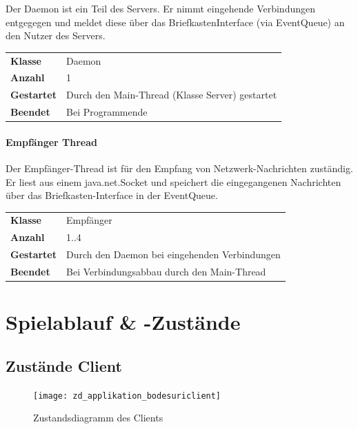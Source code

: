 \documentclass[12pt,halfparskip]{scrartcl}
\begin{document}
Der Daemon ist ein Teil des Servers. Er nimmt eingehende Verbindungen entgegegen und meldet diese über das BriefkastenInterface (via EventQueue) an den Nutzer des Servers.

\begin{tabular}{@{} l p{12.5cm}}
\textbf{Klasse}       & Daemon \\
\textbf{Anzahl}       & 1 \\
\textbf{Gestartet}    & Durch den Main-Thread (Klasse Server) gestartet \\
\textbf{Beendet}      & Bei Programmende
\end{tabular}


\paragraph{Empfänger Thread} %
\label{ssub:empfänger_thread}

Der Empfänger-Thread ist für den Empfang von Netzwerk-Nachrichten zuständig. Er liest aus einem java.net.Socket und speichert die eingegangenen Nachrichten über das Briefkasten-Interface in der EventQueue.

\begin{tabular}{@{} l p{12.5cm}}
\textbf{Klasse}       & Empfänger \\
\textbf{Anzahl}       & 1..4 \\
\textbf{Gestartet}    & Durch den Daemon bei eingehenden Verbindungen  \\
\textbf{Beendet}      & Bei Verbindungsabbau durch den Main-Thread
\end{tabular}


\clearpage
\section{Spielablauf \& -Zustände} %
\label{spielzustaende_nachrichten}
\subsection{Zustände Client} %
\label{sub:zustände_client}
\begin{figure}[h]
	\centering
	\texttt{[image: zd\_applikation\_bodesuriclient]}
	\caption{Zustandsdiagramm des Clients}
	\label{fig:zd_applikation_bodesuriclient}
\end{figure}
\end{document}
